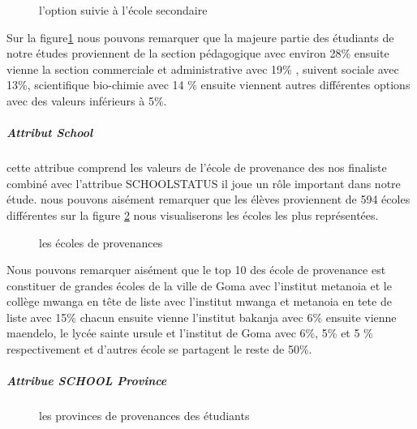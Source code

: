 \begin{figure}[!htbp]
	\centering
	\caption[Short caption]{l'option suivie à l'école secondaire }
	\label{fig:Option_right}
\end{figure}
Sur la figure\ref{fig:Option_right} nous pouvons remarquer que la majeure partie des
étudiants de notre études proviennent de la section pédagogique avec
environ 28\% ensuite vienne la section commerciale et administrative
avec 19\% , suivent sociale avec 13\%, scientifique bio-chimie avec 14
\% ensuite viennent autres différentes options avec des valeurs
inférieurs à 5\%.
\subparagraph{Attribut School}\label{attribut-school}
cette attribue comprend les valeurs de l'école de provenance des nos
finaliste combiné avec l'attribue SCHOOLSTATUS  il joue un rôle
important dans notre étude.
nous pouvons aisément remarquer que les élèves proviennent de 594 écoles
différentes sur la figure \ref{fig:SCHOOL} nous visualiserons les écoles
les plus représentées.
\begin{figure}[!htbp]
	\centering
	\caption[Short caption]{les écoles de provenances  }
	\label{fig:SCHOOL}
\end{figure}
Nous pouvons remarquer aisément que le top 10 des école de provenance
est constituer de grandes écoles de la ville de Goma avec l'institut
metanoia et le collège mwanga en tête de liste avec l'institut mwanga et
metanoia en tete de liste avec 15\% chacun ensuite vienne l'institut
bakanja avec 6\% ensuite vienne maendelo, le lycée sainte ursule et
l'institut de Goma avec 6\%, 5\% et 5 \% respectivement et d'autres
école se partagent le reste de 50\%.
\subparagraph{Attribue SCHOOL Province}
\begin{figure}[!htbp]
	\centering
	\caption[Short caption]{les provinces de provenances des étudiants   }
	\label{fig:SCHOOLProvince}
\end{figure}
